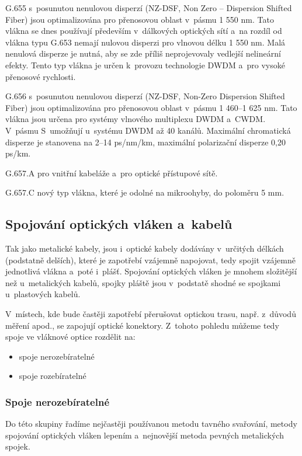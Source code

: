 G.655 s~posunutou nenulovou disperzí (NZ-DSF, Non Zero – Dispersion Shifted Fiber) jsou optimalizována pro přenosovou oblast v~pásmu 1 550 nm. Tato vlákna se dnes používají především v~dálkových optických sítí a~na rozdíl od vlákna typu G.653 nemají nulovou disperzi pro vlnovou délku 1 550 nm. Malá nenulová disperze je nutná, aby se zde příliš neprojevovaly vedlejší nelineární efekty. Tento typ vlákna je určen k~provozu technologie DWDM a~pro vysoké přenosové rychlosti.

G.656 s~posunutou nenulovou disperzí (NZ-DSF, Non-Zero Dispersion Shifted Fiber) jsou optimalizována pro přenosovou oblast v~pásmu 1 460–1 625 nm. Tato vlákna jsou určena pro systémy vlnového multiplexu DWDM a~CWDM. V~pásmu S~umožňují u~systému DWDM až 40 kanálů. Maximální chromatická disperze je stanovena na 2–14 ps/nm/km, maximální polarizační disperze 0,20 ps/km.

G.657.A pro vnitřní kabeláže a~pro optické přístupové sítě.

G.657.C nový typ vlákna, které je odolné na mikroohyby, do poloměru 5 mm.

\subsection{Spojování optických vláken a~kabelů}
Tak jako metalické kabely, jsou i~optické kabely dodávány v~určitých délkách (podstatně delších), které je zapotřebí vzájemně napojovat, tedy spojit vzájemně jednotlivá vlákna a~poté i~plášť. Spojování optických vláken je mnohem složitější než u~metalických kabelů, spojky pláště jsou v~podstatě shodné se spojkami u~plastových kabelů.

V~místech, kde bude častěji zapotřebí přerušovat optickou trasu, např. z~důvodů měření apod., se zapojují optické konektory. Z~tohoto pohledu můžeme tedy spoje ve vláknové optice rozdělit na:
\begin{itemize}
  \item spoje nerozebíratelné
  \item spoje rozebíratelné
\end{itemize}

\subsubsection{Spoje nerozebíratelné}
Do této skupiny řadíme nejčastěji používanou metodu tavného svařování, metody spojování optických vláken lepením a~nejnovější metoda pevných metalických spojek.


